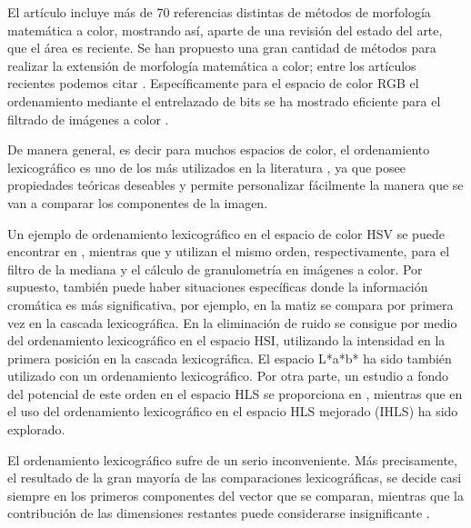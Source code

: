 El art\'iculo \cite{aptoula2007comparative} incluye m\'as de 70 referencias distintas de m\'etodos de morfolog\'ia matem\'atica a color, mostrando as\'i, aparte de una revisi\'on del estado del arte, que el \'area es reciente. Se han propuesto una gran cantidad de m\'etodos para realizar la extensi\'on de morfolog\'ia matem\'atica a color; entre los art\'iculos recientes podemos citar \cite{ledoux2012limits, van2013group, velasco2012random, lezoray2009learning, velasco2010morphological, burgeth2013morphology, velasco2011supervised, hanbury2001morphological, angulo2010pseudo, aptoula2008alpha, kleefeld2015processing, vazquez2014color}. 
Espec\'ificamente para el espacio de color RGB el ordenamiento mediante el entrelazado de bits se ha mostrado eficiente para el filtrado de im\'agenes a color \cite{chanussot1997bit}. 

De manera general, es decir para muchos espacios de color, el ordenamiento lexicogr\'afico es  uno de los m\'as utilizados en la literatura \cite{aptoula2007comparative, aptoula2008lexicographical}, ya que posee propiedades te\'oricas deseables y permite personalizar f\'acilmente la manera que se van a comparar los componentes de la imagen. 

Un ejemplo de ordenamiento lexicogr\'afico en el espacio de color HSV se puede encontrar en \cite{louverdis2002new}, mientras que \cite{louverdis2002morphological} y \cite{vardavoulia2002vector} utilizan el mismo orden, respectivamente, para el filtro de la mediana y el c\'alculo de granulometr\'ia en im\'agenes a color. Por supuesto, tambi\'en puede haber situaciones espec\'ificas donde la informaci\'on crom\'atica es m\'as significativa, por ejemplo, en \cite{ortiz2002colour} la matiz se compara por primera vez en la cascada lexicogr\'afica.  En \cite{ortiz2004gaussian} la eliminaci\'on de ruido se consigue por medio del ordenamiento lexicogr\'afico en el espacio HSI, utilizando la intensidad en la primera posici\'on en la cascada lexicogr\'afica. El espacio L*a*b* \cite{hanbury2002mathematical3} ha sido tambi\'en utilizado con un ordenamiento lexicogr\'afico. Por otra parte, un estudio a fondo del potencial de este orden en el espacio HLS se proporciona en \cite{hanbury2001mathematical2}, mientras que en \cite{angulo2003mathematical} el uso del ordenamiento lexicogr\'afico en el espacio HLS mejorado (IHLS) ha sido explorado.

El ordenamiento lexicogr\'afico sufre de un serio inconveniente. M\'as precisamente, el resultado de la gran mayor\'ia de las comparaciones lexicogr\'aficas, se decide casi siempre en los primeros componentes del vector que se comparan, mientras que la contribuci\'on de las dimensiones restantes puede considerarse insignificante \cite{hanbury2002mathematical3}. 


